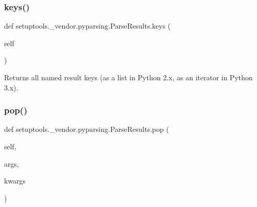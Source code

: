 \subsubsection{\texorpdfstring{keys()}{keys()}}
{\footnotesize\ttfamily def setuptools.\+\_\+vendor.\+pyparsing.\+Parse\+Results.\+keys (\begin{DoxyParamCaption}\item[{}]{self }\end{DoxyParamCaption})}

\begin{DoxyVerb}Returns all named result keys (as a list in Python 2.x, as an iterator in Python 3.x).\end{DoxyVerb}
 \mbox{\label{classsetuptools_1_1__vendor_1_1pyparsing_1_1_parse_results_ae1b6359f87bc468ff9f6199c3b515a6f}} 
\subsubsection{\texorpdfstring{pop()}{pop()}}
{\footnotesize\ttfamily def setuptools.\+\_\+vendor.\+pyparsing.\+Parse\+Results.\+pop (\begin{DoxyParamCaption}\item[{}]{self,  }\item[{}]{args,  }\item[{}]{kwargs }\end{DoxyParamCaption})}

